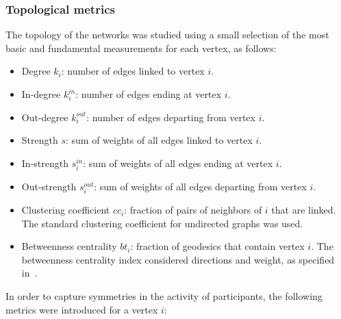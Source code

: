 \documentclass[%
	aip,
	jmp,%
	amsmath,amssymb,
	reprint,%
]{revtex4-1}
\begin{document}

\subsubsection{Topological metrics}\label{measures}

The topology of the networks was studied using a small selection of the most basic and fundamental measurements for each vertex, as follows:

\begin{itemize}
	\item Degree     $k_i$: number of edges linked to vertex $i$.
	\item In-degree  $k_i^{in}$: number of edges ending at vertex $i$.
	\item Out-degree $k_i^{out}$: number of edges departing from vertex $i$.
	\item Strength $s$: sum of weights of all edges linked to vertex $i$.
	\item In-strength $s_i^{in}$: sum of weights of all edges ending at vertex $i$.
	\item Out-strength $s_i^{out}$: sum of weights of all edges departing from vertex $i$.
	\item Clustering coefficient $cc_i$: fraction of pairs of neighbors of $i$ that are linked.  The standard clustering coefficient for undirected graphs was used.
	\item Betweenness centrality $bt_i$: fraction of geodesics that contain vertex $i$. The betweenness centrality index considered directions and weight, as specified in~\cite{faster}.
\end{itemize}

In order to capture symmetries in the activity of participants, the following metrics were introduced for a vertex $i$: 
\end{document}
